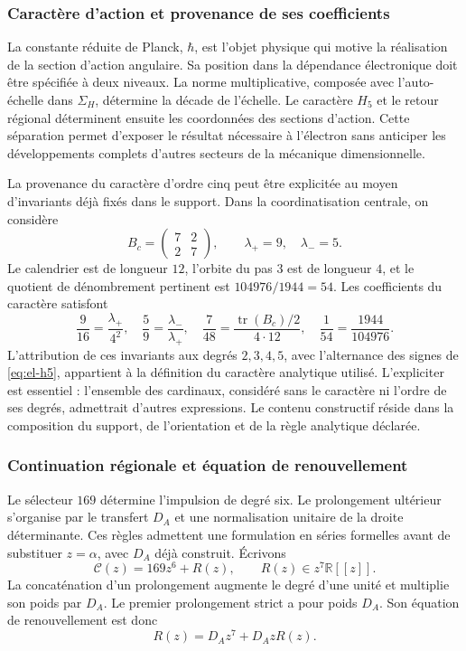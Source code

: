 \subsubsection{Caractère d'action et provenance de ses coefficients}
\label{sec:revision-planck}

La constante réduite de Planck, \(\hbar\), est l’objet physique qui
motive la réalisation de la section d’action angulaire. Sa position dans
la dépendance électronique doit être spécifiée à deux niveaux. La norme
multiplicative, composée avec l’auto-échelle dans \(\Sigma_H\), détermine la décade de l’échelle. Le caractère
\(H_5\) et le retour régional déterminent ensuite les coordonnées des
sections d’action. Cette séparation permet d’exposer le résultat
nécessaire à l’électron sans anticiper les développements complets
d’autres secteurs de la mécanique dimensionnelle.

La provenance du caractère d'ordre cinq peut être explicitée au moyen
d'invariants déjà fixés dans le support. Dans la coordinatisation centrale, on considère
\[
 B_c=\begin{pmatrix}7&2\\2&7\end{pmatrix},
 \qquad \lambda_+=9,\quad\lambda_-=5.
\]
Le calendrier est de longueur \(12\), l'orbite du pas \(3\) est de
longueur \(4\), et le quotient de dénombrement pertinent est
\(104976/1944=54\). Les coefficients du caractère satisfont
\begin{equation}
 \frac9{16}=\frac{\lambda_+}{4^2},\quad
 \frac59=\frac{\lambda_-}{\lambda_+},\quad
 \frac7{48}=\frac{\operatorname{tr}(B_c)/2}{4\cdot12},\quad
 \frac1{54}=\frac{1944}{104976}.
 \label{eq:revision-h5-coeficientes}
\end{equation}
L'attribution de ces invariants aux degrés \(2,3,4,5\), avec
l'alternance des signes de \eqref{eq:el-h5}, appartient à la définition du
caractère analytique utilisé. L'expliciter est essentiel : l'ensemble des
cardinaux, considéré sans le caractère ni l'ordre de ses degrés,
admettrait d'autres expressions. Le contenu constructif réside dans la
composition du support, de l'orientation et de la règle analytique déclarée.

\subsubsection{Continuation régionale et équation de renouvellement}

Le sélecteur \(169\) détermine l’impulsion de degré six. Le prolongement
ultérieur s’organise par le transfert \(D_A\) et une normalisation
unitaire de la droite déterminante. Ces règles admettent une formulation
en séries formelles avant de substituer \(z=\alpha\), avec \(D_A\) déjà
construit. Écrivons
\[
 \mathscr C(z)=169z^6+R(z),\qquad R(z)\in z^7\mathbb R[[z]].
\]
La concaténation d'un prolongement augmente le degré d'une unité et
multiplie son poids par \(D_A\). Le premier prolongement strict a pour
poids \(D_A\). Son équation de renouvellement est donc
\begin{equation}
 R(z)=D_Az^7+D_AzR(z).
 \label{eq:revision-renovacion}
\end{equation}

